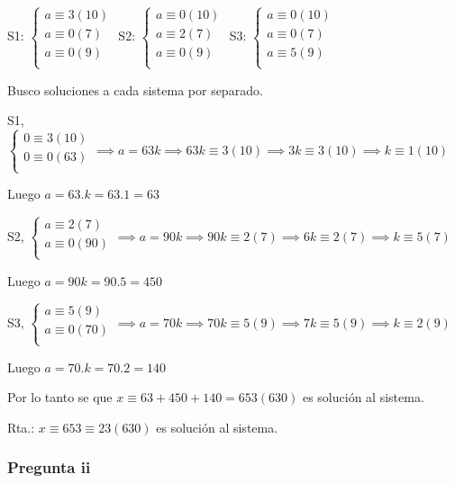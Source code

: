 S1: $ \begin{cases}
    a\equiv 3(10) \\
    a\equiv 0(7) \\
    a\equiv 0(9) \\
\end{cases} $
S2: $ \begin{cases}
    a\equiv 0(10) \\
    a\equiv 2(7) \\
    a\equiv 0(9) \\
\end{cases} $
S3: $ \begin{cases}
    a\equiv 0(10) \\
    a\equiv 0(7) \\
    a\equiv 5(9) \\
\end{cases} $

Busco soluciones a cada sistema por separado.

S1, $ \begin{cases}
    0\equiv 3(10) \\
    0\equiv 0(63) \\
\end{cases} \implies a = 63k \implies 63k \equiv 3(10) \implies 3k \equiv 3(10) \implies k \equiv 1(10)$ 

Luego $ a = 63.k = 63.1 = 63 $

S2, $ \begin{cases}
    a\equiv 2(7) \\
    a\equiv 0(90) \\
\end{cases} \implies a = 90k \implies 90k \equiv 2(7) \implies 6k \equiv 2(7) \implies k \equiv 5(7) $

Luego $ a = 90k = 90.5 = 450 $

S3, $ \begin{cases}
    a\equiv 5(9) \\
    a\equiv 0(70) \\
\end{cases} \implies a = 70k \implies 70k \equiv 5(9) \implies 7k \equiv 5(9) \implies k \equiv 2(9) $

Luego $ a = 70.k = 70.2 = 140 $

Por lo tanto se que $ x\equiv 63+450+140 = 653 (630)$ es solución al sistema.

Rta.: $ x \equiv 653 \equiv 23(630) $ es solución al sistema.

\subsubsection{Pregunta ii}

